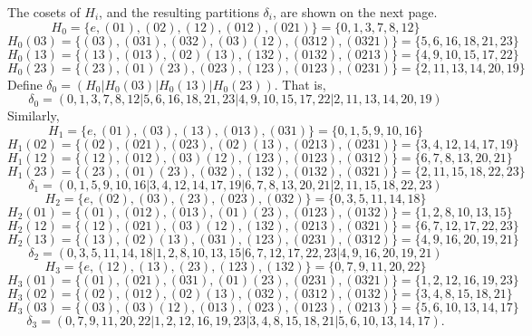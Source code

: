 The cosets of $H_i$, and the resulting partitions $\delta_i$, are shown on the
next page. 
{\small
  \[
H_0 = \{e, (01), (02), (12), (012), (021)\} = \{0, 1, 3, 7, 8, 12\}
\]
\[
H_0(03) = \{(03), (031), (032), (03)(12), (0312), (0321)\} = \{5,6,16,18,21,23\}
\]
\[
H_0(13) = \{(13), (013), (02)(13), (132), (0132), (0213)\} = \{4,9,10,15,17,22\}
\]
\[
H_0(23) = \{(23), (01)(23), (023), (123), (0123), (0231)\} = \{2,11,13,14,20,19\}
\]
Define $\delta_0 = (H_0|H_0(03)|H_0(13)|H_0(23))$. That is,
\[
\delta_0 = (0, 1, 3, 7, 8, 12|5,6,16,18,21,23|4,9,10,15,17,22|2,11,13,14,20,19)
\]
Similarly,
\[
H_1 = \{e, (01), (03), (13), (013), (031)\} = \{0, 1, 5, 9, 10, 16\}
\]
\[
H_1(02) = \{(02), (021), (023), (02)(13), (0213), (0231)\} = \{3, 4, 12, 14, 17, 19\}
\]
\[
H_1(12) = \{(12), (012), (03)(12), (123), (0123), (0312)\} = \{6, 7, 8, 13, 20, 21\}
\]
\[
H_1(23) = \{(23), (01)(23), (032), (132), (0132), (0321)\} = \{2, 11, 15, 18, 22, 23\}
\]
\[
\delta_1 = (0, 1, 5, 9, 10, 16|3, 4, 12, 14, 17, 19|6, 7, 8, 13, 20, 21|2, 11, 15, 18, 22, 23)
\]
\[
H_2 = \{e, (02), (03), (23), (023), (032)\} = \{0, 3, 5, 11, 14, 18\}
\]
\[
H_2(01) = \{(01), (012), (013), (01)(23), (0123), (0132)\} = \{1,2,8,10,13,15\}
\]
\[
H_2(12) = \{(12), (021), (03)(12), (132), (0213), (0321)\} = \{6,7,12,17,22,23\}
\]
\[
H_2(13) = \{(13), (02)(13), (031), (123), (0231), (0312)\} = \{4,9,16,20,19,21\}
\]
\[
\delta_2 = (0,3,5,11,14,18|1,2,8,10,13,15|6,7,12,17,22,23|4,9,16,20,19,21)
\]
\[
H_3 = \{e, (12), (13), (23), (123), (132)\} = \{0, 7, 9, 11, 20, 22\}
\]
\[
H_3(01) = \{(01), (021), (031), (01)(23), (0231), (0321)\} = \{1,2,12,16,19,23\}
\]
\[
H_3(02) = \{(02), (012), (02)(13), (032), (0312), (0132)\} = \{3,4,8,15,18,21\}
\]
\[
H_3(03) = \{(03), (03)(12), (013), (023), (0123), (0213)\} = \{5,6,10,13,14,17\}
\]
\[
\delta_3 = (0,7,9,11,20,22|1,2,12,16,19,23|3,4,8,15,18,21|5,6,10,13,14,17).
\]
}

